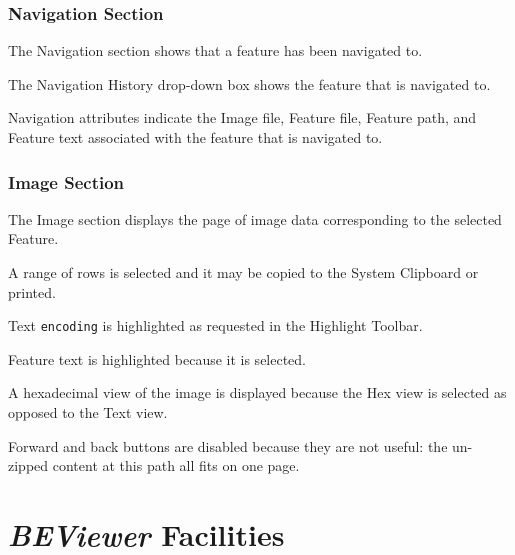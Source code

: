 \documentclass[10pt,twoside]{article}
\newcommand{\bev}{\emph{BEViewer}\xspace}
\begin{document}
\subsubsection{Navigation Section}
The Navigation section shows that a feature has been navigated to.
\begin{compactitem}
\item The Navigation History drop-down box shows the feature that is navigated to.
\item Navigation attributes indicate
the Image file, Feature file, Feature path, and Feature text
associated with the feature that is navigated to.
\end{compactitem}
\subsubsection{Image Section}
\begin{compactitem}
\item The Image section displays the page of image data
corresponding to the selected Feature.
\item A range of rows is selected and it may be copied to the System Clipboard or printed.
\item Text \texttt{encoding} is highlighted as requested in the Highlight Toolbar.
\item Feature text is highlighted because it is selected.
\item A hexadecimal view of the image is displayed because the Hex view is selected
as opposed to the Text view.
\item Forward and back buttons are disabled because they are not useful:
the un-zipped content at this path all fits on one page.
\end{compactitem}

\section{\bev Facilities}
\end{document}
